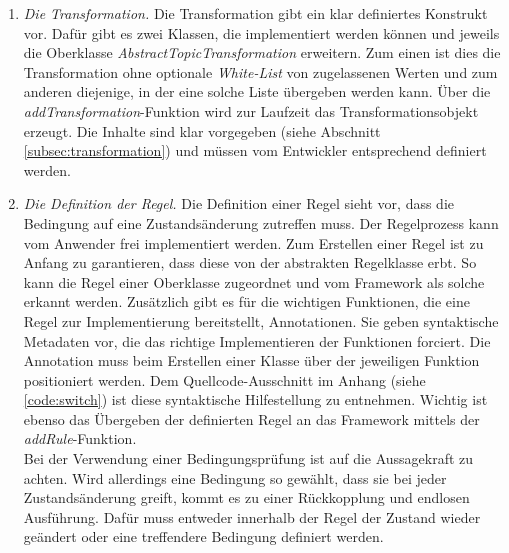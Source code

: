 \begin{enumerate}
            \item \textit{Die Transformation.}
            Die Transformation gibt ein klar definiertes Konstrukt vor. Dafür gibt es zwei Klassen, die implementiert werden können und 
            jeweils die Oberklasse \textit{AbstractTopicTransformation} erweitern. Zum einen ist dies die Transformation ohne 
            optionale \textit{White-List} von zugelassenen Werten und zum anderen diejenige, in der eine solche Liste übergeben werden kann. Über die 
            \textit{addTransformation}-Funktion wird zur Laufzeit das Transformationsobjekt erzeugt. Die Inhalte sind klar vorgegeben (siehe Abschnitt \ref{subsec:transformation}) 
            und müssen vom Entwickler entsprechend definiert werden.
            \pagebreak
            \item \textit{Die Definition der Regel.} 
            Die Definition einer Regel sieht vor, dass die Bedingung auf eine Zustandsänderung zutreffen muss. Der Regelprozess kann vom Anwender 
            frei implementiert werden. Zum Erstellen einer Regel ist zu Anfang zu garantieren, dass diese von der abstrakten Regelklasse erbt. So kann die Regel einer 
            Oberklasse zugeordnet und vom Framework als solche erkannt werden. Zusätzlich gibt es für die wichtigen Funktionen, die eine Regel zur 
            Implementierung bereitstellt, Annotationen. Sie geben syntaktische Metadaten vor, die das richtige Implementieren der Funktionen forciert. Die 
            Annotation muss beim Erstellen einer Klasse über der jeweiligen Funktion positioniert werden. Dem Quellcode-Ausschnitt im Anhang (siehe \ref{code:switch}) ist diese 
            syntaktische Hilfestellung zu entnehmen. Wichtig ist ebenso das Übergeben der definierten Regel an das Framework mittels der \textit{addRule}-Funktion. 
            \\
            Bei der Verwendung einer Bedingungsprüfung ist auf die Aussagekraft zu achten. Wird allerdings eine Bedingung so gewählt, dass sie bei jeder Zustandsänderung greift, kommt 
            es zu einer Rückkopplung und endlosen Ausführung. Dafür muss entweder innerhalb der Regel der Zustand wieder geändert oder eine treffendere Bedingung definiert werden.
        \end{enumerate}
